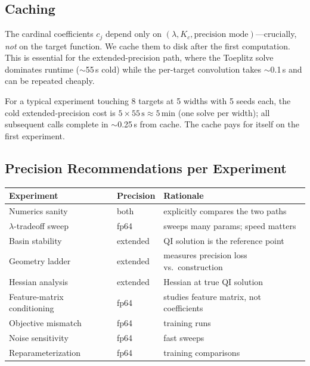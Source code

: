 \documentclass{article}
\begin{document}
\subsection{Caching}
\label{app:caching}

The cardinal coefficients \(c_j\) depend only on \((\lambda, K_c, \text{precision mode})\)---crucially, \emph{not} on the target function.  We cache them to disk after the first computation.  This is essential for the extended-precision path, where the Toeplitz solve dominates runtime (\(\sim\)55\,s cold) while the per-target convolution takes \(\sim\)0.1\,s and can be repeated cheaply.

For a typical experiment touching 8 targets at 5 widths with 5 seeds each, the cold extended-precision cost is \(5 \times 55\,\text{s} \approx 5\,\text{min}\) (one solve per width); all subsequent calls complete in \(\sim\)0.25\,s from cache.  The cache pays for itself on the first experiment.

\subsection{Precision Recommendations per Experiment}
\label{app:precision-recommendations}

\begin{center}
\small
\begin{tabular}{@{}lll@{}}
\toprule
Experiment & Precision & Rationale \\
\midrule
Numerics sanity & both & explicitly compares the two paths \\
\(\lambda\)-tradeoff sweep & fp64 & sweeps many params; speed matters \\
Basin stability & extended & QI solution is the reference point \\
Geometry ladder & extended & measures precision loss vs.\ construction \\
Hessian analysis & extended & Hessian at true QI solution \\
Feature-matrix conditioning & fp64 & studies feature matrix, not coefficients \\
Objective mismatch & fp64 & training runs \\
Noise sensitivity & fp64 & fast sweeps \\
Reparameterization & fp64 & training comparisons \\
\bottomrule
\end{tabular}
\end{center}
\end{document}
